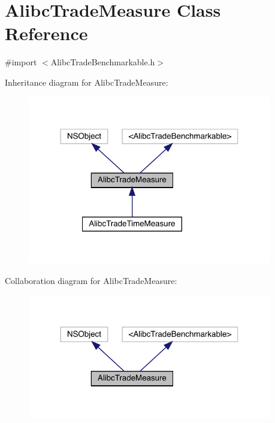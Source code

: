 \hypertarget{interface_alibc_trade_measure}{}\section{Alibc\+Trade\+Measure Class Reference}
\label{interface_alibc_trade_measure}


{\ttfamily \#import $<$Alibc\+Trade\+Benchmarkable.\+h$>$}



Inheritance diagram for Alibc\+Trade\+Measure\+:\nopagebreak
\begin{figure}[H]
\begin{center}
\leavevmode
\includegraphics[width=302pt]{interface_alibc_trade_measure__inherit__graph}
\end{center}
\end{figure}


Collaboration diagram for Alibc\+Trade\+Measure\+:\nopagebreak
\begin{figure}[H]
\begin{center}
\leavevmode
\includegraphics[width=302pt]{interface_alibc_trade_measure__coll__graph}
\end{center}
\end{figure}
